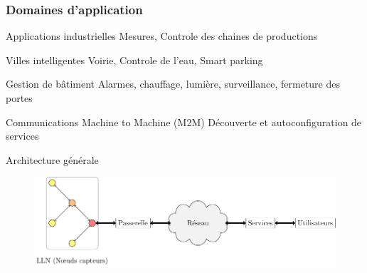 \begin{frame}\frametitle{Domaines d'application}

    \begin{block}{Applications industrielles}
      Mesures, Controle des chaines de productions
    \end{block}
  
    \begin{block}{Villes intelligentes}
      Voirie, Controle de l'eau, Smart parking
    \end{block}
  
    \begin{block}{Gestion de bâtiment}
      Alarmes, chauffage, lumière, surveillance, fermeture des portes
    \end{block}
  
    \begin{block}{Communications Machine to Machine (M2M)}
      Découverte et autoconfiguration de services
    \end{block}
  




  
\end{frame}

\begin{frame}{Architecture générale}
  \begin{figure}
    \centering
    \includegraphics[scale=.75]{figures/architecture_general_slides.pdf}
  \end{figure}


\end{frame}

